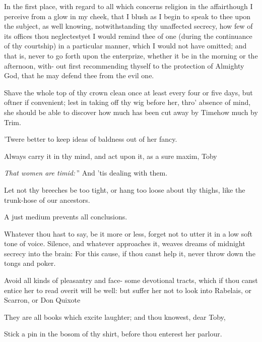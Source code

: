 \documentclass{article}
\begin{document}
In the first place, with regard to all which concerns religion
in the affair\tsh\break though I perceive from a glow in my
cheek, that I blush as I begin to speak to thee upon the subject,
as well knowing, notwithstanding thy unaffected secrecy, how few of
its offices thou neglectest\tsk yet I would remind thee of one
(during the continuance of thy courtship) in a particular manner,
which I would not have omitted; and that is, never to go forth upon
the enterprize, whether it be in the morning or the afternoon,
with-
out first recommending thyself to the protection of Almighty
God, that he may defend thee from the evil one.

Shave the whole top of thy crown clean once at least every four
or five days, but oftner if convenient; lest in taking off thy wig
before her, thro’ absence of mind, she should be able to
discover how much has been cut away by Time\tsh how much
by Trim.

\tsh ’Twere better to keep ideas of baldness out of her
fancy.

Always carry it in thy mind, and act upon it, as a sure maxim,
Toby\tsh

\lqq\textit{That women are timid:}\,” And ’tis\break
{}
dealing with them.

Let not thy breeches be too tight, or hang too loose about thy
thighs, like the trunk-hose of our ancestors.

\tsh A just medium prevents all conclusions.

Whatever thou hast to say, be it more or less, forget not to
utter it in a low soft tone of voice. Silence,
and whatever\break
approaches it, weaves dreams of mid\-night secrecy into the brain:
For this cause, if thou canst help it, never throw down the
tongs and poker.

Avoid all kinds of pleasantry and face-
some devotional tracts, which if thou canst entice her to read
over\tsk it will be well: but suffer her not to look into
Rabelais, or Scarron, or Don Quixote\tsh

\tsh They are all books which excite laughter; and thou
knowest, dear Toby, 

Stick a pin in the bosom of thy shirt, before thou enterest her
parlour.
\end{document}
